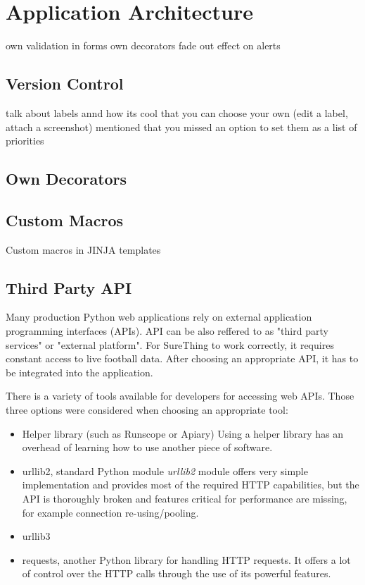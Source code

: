 \section{Application Architecture}
own validation in forms
own decorators
fade out effect on alerts

\subsection{Version Control}
talk about labels annd how its cool that you can choose your own (edit a label, attach a screenshot)
mentioned that you missed an option to set them as a list of priorities

\subsection{Own Decorators}
\subsection{Custom Macros}
Custom macros in JINJA templates

\subsection{Third Party API}
	Many production Python web applications rely on external application programming interfaces (APIs). API can be also reffered to as "third party services" or "external platform".\cite{apiintegration}  For SureThing to work correctly, it requires constant access to live football data. After choosing an appropriate API, it has to be integrated into the application. 

	There is a variety of tools available for developers for accessing web APIs. Those three options were considered when choosing an appropriate tool:
	
\begin{itemize}
	\item Helper library (such as Runscope or Apiary)
	Using a helper library has an overhead of learning how to use another piece of software.
	\item urllib2, standard Python module
	\emph{urllib2} module offers very simple implementation and provides most of the required HTTP capabilities, but the API is thoroughly broken and features critical for performance are missing, for example connection re-using/pooling. 
	\item urllib3
	\item requests, another Python library for handling HTTP requests. It offers a lot of control over the HTTP calls through the use of its powerful features.
\end{itemize}
		
